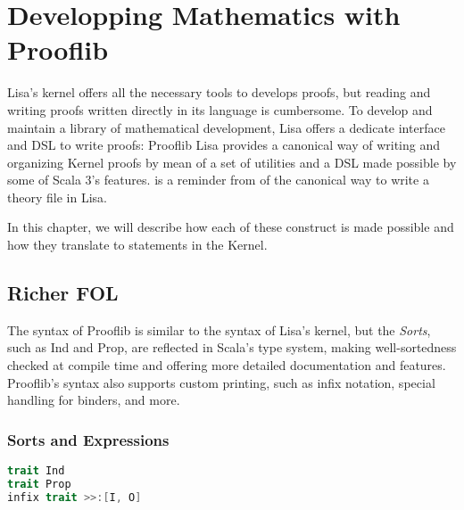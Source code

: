 \chapter{Developping Mathematics with Prooflib}
\label{chapt:prooflib}
Lisa's kernel offers all the necessary tools to develops proofs, but  reading and writing proofs written directly in its language is cumbersome.
To develop and maintain a library of mathematical development, Lisa offers a dedicate interface and DSL to write proofs: Prooflib
Lisa provides a canonical way of writing and organizing Kernel proofs by mean of a set of utilities and a DSL made possible by some of Scala 3's features.
 is a reminder from  of the canonical way to write a theory file in Lisa.

\begin{figure}
\end{figure}

In this chapter, we will describe how each of these construct is made possible and how they translate to statements in the Kernel.

\section{Richer FOL}

The syntax of Prooflib is similar to the syntax of Lisa's kernel, but the \textit{Sorts}, such as Ind and Prop, are reflected in Scala's type system, making well-sortedness checked at compile time and offering more detailed documentation and features. Prooflib's syntax also supports custom printing, such as infix notation, special handling for binders, and more.

\subsection{Sorts and Expressions}

\begin{definition}[Sorts]\phantom{.}
  \begin{lstlisting}[language=scala]
trait Ind
trait Prop
infix trait >>:[I, O]
  \end{lstlisting}

\end{definition}

